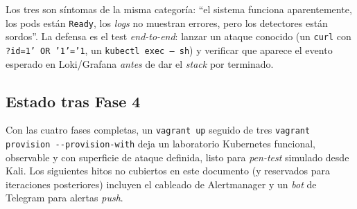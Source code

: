 Los tres son síntomas de la misma categoría: ``el sistema funciona aparentemente, los pods están \texttt{Ready}, los \emph{logs} no muestran errores, pero los detectores están sordos''. La defensa es el test \emph{end-to-end}: lanzar un ataque conocido (un \texttt{curl} con \texttt{?id=1' OR '1'='1}, un \texttt{kubectl exec -- sh}) y verificar que aparece el evento esperado en Loki/Grafana \emph{antes} de dar el \emph{stack} por terminado.

\subsection{Estado tras Fase 4}

Con las cuatro fases completas, un \texttt{vagrant up} seguido de tres \texttt{vagrant provision -{}-provision-with} deja un laboratorio Kubernetes funcional, observable y con superficie de ataque definida, listo para \emph{pen-test} simulado desde Kali. Los siguientes hitos no cubiertos en este documento (y reservados para iteraciones posteriores) incluyen el cableado de Alertmanager y un \emph{bot} de Telegram para alertas \emph{push}.
